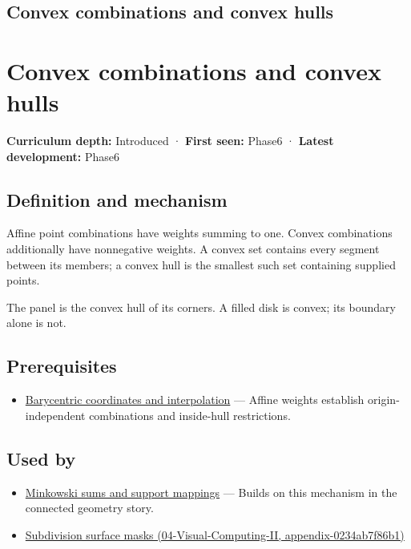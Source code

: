 \hypertarget{appendix-0026ec42c9d5}{}
\section*{Convex combinations and convex hulls}
\chapter{Convex combinations and convex hulls}\label{appendix-0026ec42c9d5-convex-combinations-and-convex-hulls}

\textbf{Curriculum depth:} Introduced · \textbf{First seen:} Phase6 · \textbf{Latest development:} Phase6

\section{Definition and mechanism}\label{appendix-0026ec42c9d5-definition-and-mechanism}

Affine point combinations have weights summing to one. Convex combinations additionally have nonnegative weights. A convex set contains every segment between its members; a convex hull is the smallest such set containing supplied points.

The panel is the convex hull of its corners. A filled disk is convex; its boundary alone is not.

\section{Prerequisites}\label{appendix-0026ec42c9d5-prerequisites}

\begin{itemize}
\tightlist
\item
  \hyperref[appendix-02b9d9a81dca]{Barycentric coordinates and interpolation} --- Affine weights establish origin-independent combinations and inside-hull restrictions.
\end{itemize}

\section{Used by}\label{appendix-0026ec42c9d5-used-by}

\begin{itemize}
\tightlist
\item
  \hyperref[appendix-215ac7099a82]{Minkowski sums and support mappings} --- Builds on this mechanism in the connected geometry story.
\item
  \href{../04-Visual-Computing-II/main.pdf\#nameddest=appendix-0234ab7f86b1}{Subdivision surface masks (04-Visual-Computing-II, appendix-0234ab7f86b1)}
\end{itemize}

